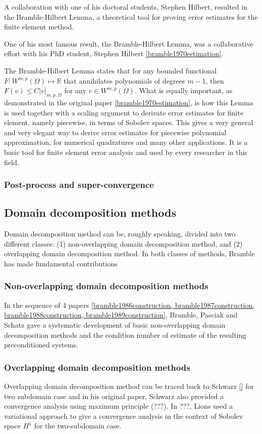 \documentclass[CJK,11pt]{amsart}
\theoremstyle{definition}
\begin{document}
\begin{CJK*}{UTF8}{gbsn}
A collaboration with one of his doctoral students, Stephen Hilbert, resulted in the Bramble-Hilbert Lemma, a theoretical tool for proving error estimates for the finite element method.

One of his most famous result, the Bramble-Hilbert Lemma, was a collaborative effort with his PhD student, Stephen Hilbert \eqref{bramble1970estimation}.

The Bramble-Hilbert Lemma states that for any bounded functional $F:W^{m,p}(\Omega)\mapsto\mathbb R$ that annihilates polynomials of degrees $m-1$, then $F(v)\le C|v|_{m,p,\Omega}$ for any $v\in W^{m,p}(\Omega)$.  What is equally important, as demonstrated in the original paper \eqref{bramble1970estimation}, is how this Lemma is used together with a scaling argument to derivate error estimates for finite element, namely piecewise, 
in terms of Sobolev spaces.  This gives a very general and very elegant way to derive error estimates for piecewise polynomial approximation, for numerical quadratures and many other applications.  It is a basic tool for finite element error analysis and used by every researcher in this field. 


\subsubsection{Post-process and super-convergence}


\subsection{Domain decomposition methods}
Domain decomposition method can be, roughly speaking, divided into two different classes: (1) non-overlapping domain decomposition method, and (2) overlapping domain decomposition method.  In both classes of methods, Bramble has made fundamental contributions

\subsubsection{Non-overlapping domain decomposition methods}
In the sequence of 4 papers \eqref{bramble1986construction, bramble1987construction, bramble1988construction, bramble1989construction}, Bramble, Pasciak and Schatz gave a systematic development of basic non-overlapping domain decomposition methods and the condition number of estimate of the resulting preconditioned systems. 

\subsubsection{Overlapping domain decomposition methods}
Overlapping domain decomposition method can be traced back to Schwarz \eqref{} for two subdomain case and in his original paper, Schwarz also provided a convergence analysis using maximum principle (???).  In ???, Lions used a variational approach to give a convergence analysis in the context of Sobolev space $H^1$ for the two-subdomain case.


\end{CJK*}
\end{document}
